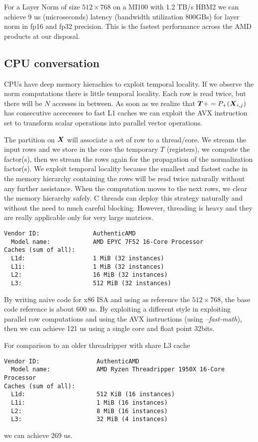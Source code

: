 \documentclass[acmsmall]{acmart}
\begin{document}
For a Layer Norm of size $512 \times 768$ on a MI100 with 1.2 TB/s
HBM2 we can achieve 9 us (microseconds) latency (bandwidth utilization
800GBs) for layer norm in fp16 and fp32 precision. This is the fastest
performance across the AMD products at our disposal.

\subsection{CPU conversation}
CPUs have deep memory hierachies to exploit temporal locality. If we
observe the norm computations there is little temporal locality. Each
row is read twice, but there will be $N$ accesses in between. As soon
as we realize that ${\boldsymbol T} += P_+({\boldsymbol X}_{i,j})$ has consecutive
accecesses to fast L1 caches we can exploit the AVX instruction set to
transform scalar operations into parallel vector operations.

The partition on ${\boldsymbol X}$ will associate a set of row to a
thread/core. We stream the input rows and we store in the core the
temporary $T$ (registers), we compute the factor(s), then we stream
the rows again for the propagation of the normalization factor(s). We
exploit temporal locality because the smallest and fastest cache in
the memory hierarchy containing the rows will be read twice naturally
without any further assistance. When the computation moves to the next
rows, we clear the memory hierarchy safely. C threads can deploy this
strategy naturally and without the need to much careful
blocking. However, threading is heavy and they are really applicable
only for very large matrices.

{\tiny  \begin{verbatim}
Vendor ID:               AuthenticAMD
  Model name:            AMD EPYC 7F52 16-Core Processor
Caches (sum of all):     
  L1d:                   1 MiB (32 instances)
  L1i:                   1 MiB (32 instances)
  L2:                    16 MiB (32 instances)
  L3:                    512 MiB (32 instances)
\end{verbatim} }

By writing naive code for x86 ISA and using as reference the $512
\times 768$, the base code reference is about 600 us. By exploiting a
different style in exploiting parallel row computations and using the
AVX instructions (using {\em --fast-math}), then we can achieve 121 us
using a single core and float point 32bits.

For comparison to an older threadripper with share L3 cache 
{\tiny  \begin{verbatim}
Vendor ID:                AuthenticAMD
  Model name:             AMD Ryzen Threadripper 1950X 16-Core Processor
Caches (sum of all):      
  L1d:                    512 KiB (16 instances)
  L1i:                    1 MiB (16 instances)
  L2:                     8 MiB (16 instances)
  L3:                     32 MiB (4 instances)
\end{verbatim} }
we can achieve 269 us.
\end{document}
